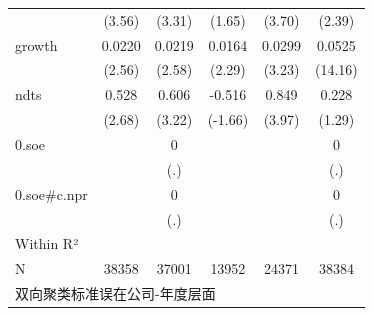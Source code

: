 {\begin{tabular}{l*{5}{c}}
            &      (3.56)         &      (3.31)         &      (1.65)         &      (3.70)         &      (2.39)         \\
[1em]
growth      &      0.0220\sym{**} &      0.0219\sym{**} &      0.0164\sym{**} &      0.0299\sym{***}&      0.0525\sym{***}\\
            &      (2.56)         &      (2.58)         &      (2.29)         &      (3.23)         &     (14.16)         \\
[1em]
ndts        &       0.528\sym{**} &       0.606\sym{***}&      -0.516         &       0.849\sym{***}&       0.228         \\
            &      (2.68)         &      (3.22)         &     (-1.66)         &      (3.97)         &      (1.29)         \\
[1em]
0.soe       &                     &           0         &                     &                     &           0         \\
            &                     &         (.)         &                     &                     &         (.)         \\
[1em]
0.soe#c.npr &                     &           0         &                     &                     &           0         \\
            &                     &         (.)         &                     &                     &         (.)         \\
\hline
Within R²   &                     &                     &                     &                     &                     \\
N           &       38358         &       37001         &       13952         &       24371         &       38384         \\
\hline\hline
\multicolumn{6}{l}{\footnotesize 双向聚类标准误在公司-年度层面}\\
\end{tabular}
}

